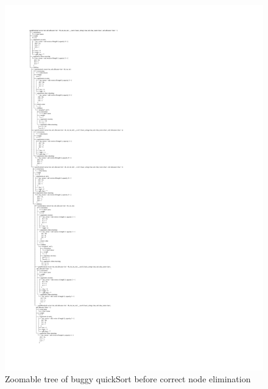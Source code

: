 \begin{figure}[p]
\centering
    \caption{Zoomable tree of buggy quickSort before correct node elimination}
    \label{fig:buggyTreeBefore}
\includegraphics[width=\textwidth,height=\textheight,keepaspectratio]{Imagenes/Vectorial/buggy.pdf}
\end{figure}

